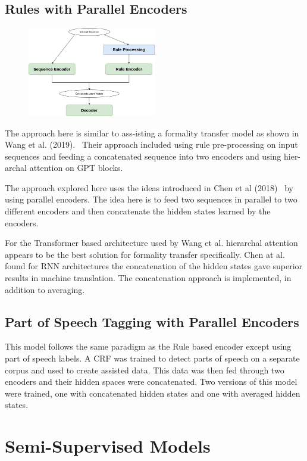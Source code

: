 \documentclass[12pt]{article}
\begin{document}
\subsection{Rules with Parallel Encoders}
\begin{figure}
    \centering
    \includegraphics[width=0.5\textwidth]{Rule Concat.png}
\end{figure}
The approach here is similar to ass-isting a formality transfer model
as shown in Wang et al. (2019).~\cite{rule-harnessing}
Their approach included using rule pre-processing on input sequences and feeding 
a concatenated sequence into two encoders and using hier-archal attention on GPT blocks. \par 
The approach explored here uses the ideas introduced in Chen et al (2018)~\cite{parallelencoders}
by using parallel encoders. The idea here is to feed two sequences in parallel to two different
encoders and then concatenate the hidden states learned by the encoders. \par
For the Transformer
based architecture used by Wang et al. hierarchal attention appears to be the best solution
for formality transfer specifically. Chen at al. found for RNN architectures the concatenation 
of the hidden states gave superior results in machine translation. The concatenation approach
is implemented, in addition to averaging.  

\subsection{Part of Speech Tagging with Parallel Encoders}
This model follows the same paradigm as the Rule based encoder except using part of 
speech labels. A CRF was trained to detect parts of speech on a separate corpus and used 
to create assisted data. This data was then fed through two encoders and their hidden spaces
were concatenated. Two versions of this model were trained, one with concatenated hidden 
states and one with averaged hidden states. 

\section{Semi-Supervised Models}
\end{document}
